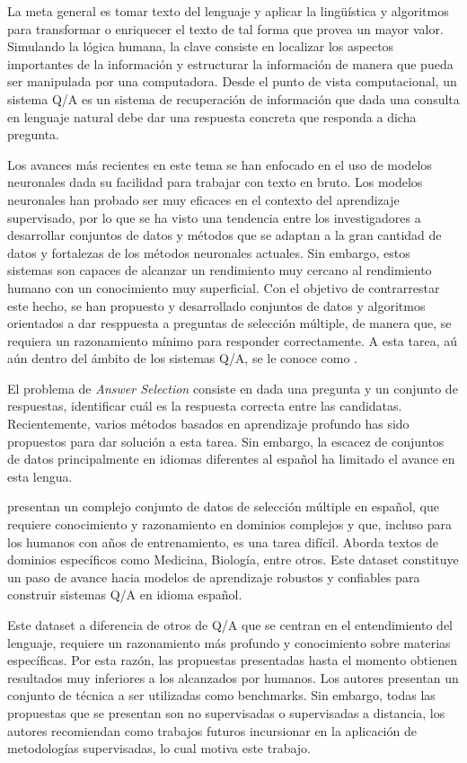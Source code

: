 La meta general es tomar texto del lenguaje y aplicar la lingüística y algoritmos para transformar o enriquecer el texto de tal forma que provea un mayor valor. Simulando la lógica humana, la clave consiste en localizar los aspectos importantes de la información y estructurar la información de manera que pueda ser manipulada por una computadora. Desde el punto de vista computacional, un sistema Q/A es un sistema de recuperación de información que dada una consulta en lenguaje natural debe dar una respuesta concreta que responda a dicha pregunta. 

Los avances más recientes en este tema se han enfocado en el uso de modelos neuronales dada su facilidad para trabajar con texto en bruto. Los modelos neuronales han probado ser muy eficaces en el contexto del aprendizaje supervisado, por lo que se ha visto una tendencia entre los investigadores a desarrollar conjuntos de datos y métodos que se adaptan a la gran cantidad de datos y fortalezas de los métodos neuronales actuales. Sin embargo, estos sistemas son capaces de alcanzar un rendimiento muy cercano al rendimiento humano con un conocimiento muy superficial. Con el objetivo de contrarrestar este hecho, se han propuesto y desarrollado conjuntos de datos y algoritmos orientados a dar resppuesta a preguntas de selección múltiple, de manera que, se requiera un razonamiento mínimo para responder correctamente. A esta tarea, aú aún dentro del ámbito de los sistemas Q/A, se le conoce como . 

El problema de \textit{Answer Selection} consiste en dada una pregunta y un conjunto de respuestas, identificar cuál es la respuesta correcta entre las candidatas. Recientemente, varios métodos basados en aprendizaje profundo has sido propuestos para dar solución a esta tarea. Sin embargo, la escacez de conjuntos de datos principalmente en idiomas diferentes al español ha limitado el avance en esta lengua. 

\cite{2019-head-qa} presentan un complejo conjunto de datos de selección múltiple en español, que requiere conocimiento y razonamiento en dominios complejos y que, incluso para los humanos con años de entrenamiento, es una tarea difícil. Aborda textos de dominios específicos como Medicina, Biología, entre otros. Este dataset constituye un paso de avance hacia modelos de aprendizaje robustos y confiables para construir sistemas Q/A en idioma español. 

Este dataset a diferencia de otros de Q/A que se centran en el entendimiento del lenguaje, requiere un razonamiento más profundo y conocimiento sobre materias específicas. Por esta razón, las propuestas presentadas hasta el momento obtienen resultados muy inferiores a los alcanzados por humanos. Los autores presentan un conjunto de técnica a ser utilizadas como benchmarks. Sin embargo, todas las propuestas que se presentan son no supervisadas o supervisadas a distancia, los autores recomiendan como trabajos futuros incursionar en la aplicación de metodologías supervisadas, lo cual motiva este trabajo.

